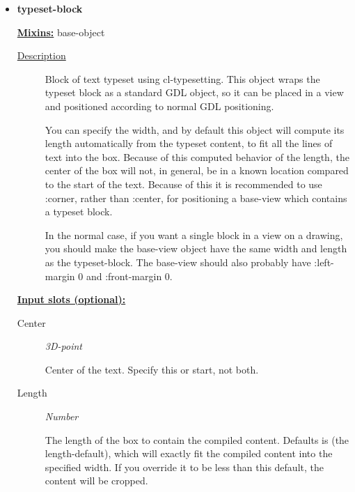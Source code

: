 \documentclass [11pt]{book}
\begin{document}
\begin{itemize}
\item {}
\label{prim:typeset-block}
\textbf{typeset-block}


\textbf{
\underline{Mixins:}} base-object





\begin{description}

\item [
\underline{Description}]


Block of text typeset using cl-typesetting. This object
wraps the typeset block as a standard GDL object, so it can be placed in a view and 
positioned according to normal GDL positioning.

You can specify the width, and by default this object will compute its length automatically 
from the typeset content, to fit all the lines of text into the box. Because of this 
computed behavior of the length, the center of the box will not, in general, be in a 
known location compared to the start of the text. Because of this it is recommended
to use :corner, rather than :center, for positioning a base-view which contains
a typeset block. 

In the normal case, if you want a single block in a view on a drawing, you should
make the base-view object have the same width and length as the typeset-block. The
base-view should also probably have :left-margin 0 and :front-margin 0.



\end{description}








\textbf{
\underline{Input slots (optional):}}

\begin{description}

\item [Center]
\emph{3D-point}

 Center of the text. Specify this or start, not both.




\item [Length]
\emph{Number}

 The length of the box to contain the compiled content. Defaults is (the length-default),
which will exactly fit the compiled content into the specified width. If you override it to be less
than this default, the content will be cropped.





\end{description}
\end{itemize}
\end{document}
